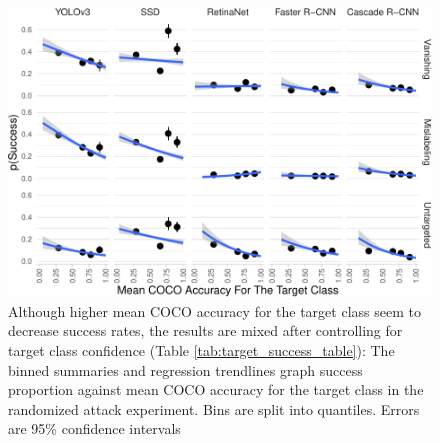 \begin{figure}[tb]

{\centering \includegraphics{imgs/target_success_graph-1} 

}

\caption{Although higher mean COCO accuracy for the target class seem to decrease success rates, the results are mixed after controlling for target class confidence (Table \ref{tab:target_success_table}):  The binned summaries and regression trendlines graph success proportion against mean COCO accuracy for the target class in the randomized attack experiment. Bins are split into quantiles. Errors are 95\% confidence intervals}\label{fig:target_success_graph}
\end{figure}

\begingroup\fontsize{9}{11}\selectfont

